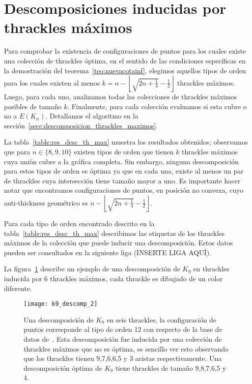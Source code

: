\section{Descomposiciones inducidas por thrackles máximos}

  Para comprobar la existencia de configuraciones de puntos para los cuales
  existe una colección de thrackles óptima, en el sentido de las condiciones
  específicas en la demostración del teorema~\ref{teo:nuevacotainf}, elegimos
  aquellos tipos de orden para los cuales existen al menos $k=n -
  \left\lfloor\sqrt{2n+\frac{1}{4}} - \frac{1}{2}\right\rfloor$ thrackles
  máximos. Luego, para cada uno, analizamos todas las colecciones de thrackles
  máximos posibles de tamaño $k$. Finalmente, para cada colección evaluamos si
  esta cubre o no a $E(K_n)$. Detallamos el algoritmo en la sección~\ref{secc:descomposicion_thrackles_maximos}.

  La tabla~\ref{table:res_desc_th_max} muestra los resultados obtenidos;
  observamos que para $n\in \{8,9,10\}$ existen tipos de orden que tienen $k$
  thrackles máximos cuya unión cubre a la gráfica completa. Sin embargo,
  ninguna descomposición para estos tipos de orden es óptima ya que en cada
  una, existe al menos un par de thrackles cuya intersección tiene tamaño mayor a uno.
  Es importante hacer notar que encontramos configuraciones de puntos, en posición no convexa, cuyo anti-thickness geométrico es $n -
  \left\lfloor\sqrt{2n+\frac{1}{4}} - \frac{1}{2}\right\rfloor$.

  Para cada tipo de orden encontrado descrito en la
  tabla~\ref{table:res_desc_th_max} describimos las etiquetas de los thrackles
  máximos de la colección que puede inducir una descomposición. Estos datos
  pueden ser consultados en la siguiente liga (INSERTE LIGA AQUÍ).

  La figura~\ref{fig:k9_descomp} describe un ejemplo de una descomposición de $K_9$ en thrackles inducida por 6 thrackles máximos, cada thrackle es dibujado de un color diferente.

  \begin{figure}
    \centering
    \texttt{[image: k9\_descomp\_2]}
    \caption{Una descomposición de $K_9$ en seis thrackles, la configuración de
    puntos corresponde al tipo de orden 12 con respecto de la base de datos
    de~\cite{Aichholzer2001}. Esta descomposición fue inducida por una colección
    de thrackles máximos que no es óptima, es sencillo ver esto observando que
    los thrackles tienen 9,7,6,6,5 y 3 aristas respectivamente. Una descomposición óptima de $K_9$ tiene thrackles de tamaño 9,8,7,6,5 y 4.}
    \label{fig:k9_descomp}
  \end{figure}

